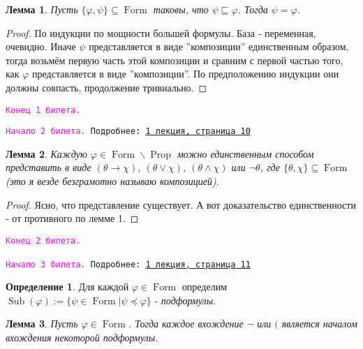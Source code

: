 \documentclass[a4paper,100pt]{article}
\theoremstyle{indented}
\newtheorem{lemma}{Лемма}
\theoremstyle{definition}
\newtheorem{defn}{Определение}
\theoremstyle{remark}
\DeclareMathOperator{\Prop}{Prop}
\DeclareMathOperator{\form}{Form}
\DeclareMathOperator{\Sub}{Sub}
\begin{document}
\begin{lemma}
  Пусть $\{\varphi , \psi\}\subseteq \form$ таковы, что $\psi \sqsubseteq \varphi$. Тогда $\psi = \varphi$. 
\end{lemma}

\begin{proof}
  По индукции по мощности большей формулы. База - переменная, очевидно. Иначе $\psi$ представляется в виде ''композиции'' единственным образом, тогда возьмём первую часть этой композиции и сравним с первой частью того, как $\varphi$ представляется в виде ''композиции''. По предположению индукции они должны совпасть, продолжение тривиально.
\end{proof}

\texttt{\textcolor{magenta}{Конец 1 билета.}} 

\hrulefill

\texttt{\hypertarget{b2}{\textcolor{magenta}{Начало 2 билета.}} Подробнее: \href{http://www.mi-ras.ru/~speranski/courses/logic-1-2021-spring/slides_1.pdf}{1 лекция, страница 10}} \\

\begin{lemma}
  Каждую $\varphi \in \form \backslash \Prop$ можно единственным способом представить в виде $(\theta \rightarrow \chi)$, $(\theta \vee \chi)$, $(\theta \wedge \chi)$ или $\neg\theta$, где $\{\theta, \chi\}\subseteq \form$ (это я везде безграмотно называю \textit{композицией}). 
\end{lemma}

\begin{proof}
  Ясно, что представление существует. А вот доказательство единственности - от противного по лемме 1.
\end{proof}

\texttt{\textcolor{magenta}{Конец 2 билета.}}

\hrulefill

\texttt{\hypertarget{b3}{\textcolor{magenta}{Начало 3 билета.}} Подробнее: \href{http://www.mi-ras.ru/~speranski/courses/logic-1-2021-spring/slides_1.pdf}{1 лекция, страница 11}} \

\begin{defn}
  Для каждой $\varphi\in \form$ определим $\Sub(\varphi):=\{\psi\in \form|\psi \preccurlyeq \varphi\}$ - \textit{подформулы}.
\end{defn}

\begin{lemma}
  Пусть $\varphi \in \form$. Тогда каждое вхождение $\neg$ или $($ является началом вхождения некоторой подформулы.
\end{lemma}
\end{document}
